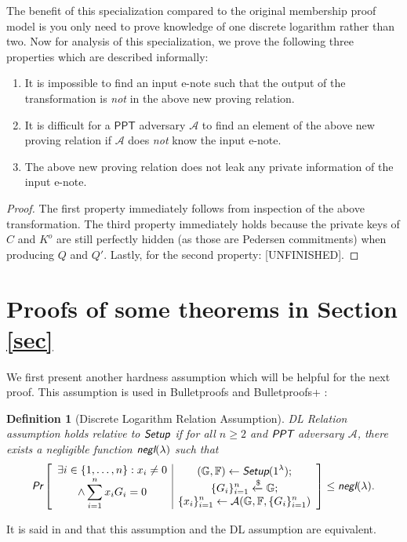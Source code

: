 \documentclass{article}
\theoremstyle{plain}
\newtheorem{definition}{Definition}[section]
\theoremstyle{remark}
\begin{document}
The benefit of this specialization compared to the original membership proof model is you only need to prove knowledge of one discrete logarithm rather than two. Now for analysis of this specialization, we prove the following three properties which are described informally:
\begin{enumerate}
\item It is impossible to find an input e-note such that the output of the transformation is \textit{not} in the above new proving relation. 
\item It is difficult for a $\textsf{PPT}$ adversary $\mathcal{A}$ to find an element of the above new proving relation if $\mathcal{A}$ does \textit{not} know the input e-note.
\item The above new proving relation does not leak any private information of the input e-note.
\end{enumerate}
\begin{proof}
The first property immediately follows from inspection of the above transformation. The third property immediately holds because the private keys of $C$ and $K^o$ are still perfectly hidden (as those are Pedersen commitments) when producing $Q$ and $Q'$. Lastly, for the second property: [UNFINISHED].
\end{proof}

\section{Proofs of some theorems in Section \ref{sec}}\label{proofs}
We first present another hardness assumption which will be helpful for the next proof. This assumption is used in Bulletproofs \cite{bp} and Bulletproofs+ \cite{bp-plus}:

\begin{definition}[Discrete Logarithm Relation Assumption]
DL Relation assumption holds relative to $\emph{\textsf{Setup}}$ if for all $n \ge 2$ and  $\emph{\textsf{PPT}}$ adversary $\mathcal{A}$, there exists a negligible function $\emph{\textsf{negl}}(\lambda)$ such that
\begin{align*}
\emph{\textsf{Pr}}\left[
\begin{array}{c|c}
	\begin{gathered}
		\exists i \in \{1, \ldots, n\}: x_i \ne 0 \\
		\wedge \sum_{i=1}^{n} x_i G_i = 0
	\end{gathered}
	&
	\begin{gathered}
		(\mathbb{G}, \mathbb{F})\leftarrow\emph{\textsf{Setup}}(1^{\lambda}); \\
		\{G_i\}_{i=1}^n \xleftarrow{\$}\mathbb{G}; \\
		\{x_i\}_{i=1}^n \leftarrow\mathcal{A}(\mathbb{G}, \mathbb{F}, \{G_i\}_{i=1}^n) \\
	\end{gathered}
\end{array}
\right]
\le \emph{\textsf{negl}}(\lambda).
\end{align*}
\end{definition}
It is said in \cite{bp} and \cite{bp-plus} that this assumption and the DL assumption are equivalent.
\end{document}
